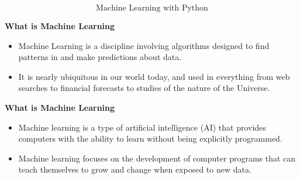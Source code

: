 \documentclass[MASTER.tex]{subfiles}
\begin{document}
 
	
	
	\begin{frame}
		\huge
		\[ \mbox{Machine Learning with Python} \]
	\end{frame}
	
\begin{frame}
\Large
\textbf{What is Machine Learning}
\begin{itemize}
\item Machine Learning is a discipline involving algorithms designed to find patterns in and make predictions about data. 
\item It is nearly ubiquitous in our world today, and used in everything from web searches to financial forecasts to studies of the nature of the Universe. 
\end{itemize}
 

\end{frame}


\begin{frame}
\Large
\textbf{What is Machine Learning}
\begin{itemize}
	\item	
Machine learning is a type of artificial intelligence (AI) that provides computers with the ability to learn without being explicitly programmed. 
\item Machine learning focuses on the development of computer programs that can teach themselves to grow and change when exposed to new data. 
\end{itemize}
\end{frame}
\end{document}

